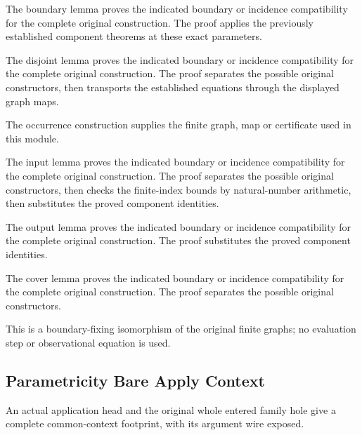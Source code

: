 The boundary lemma proves the indicated boundary or incidence compatibility for the complete original construction.
The proof applies the previously established component theorems at these exact parameters.
\par{}

The disjoint lemma proves the indicated boundary or incidence compatibility for the complete original construction.
The proof separates the possible original constructors, then transports the established equations through the displayed graph maps.
\par{}

The occurrence construction supplies the finite graph, map or certificate used in this module.
\par{}

The input lemma proves the indicated boundary or incidence compatibility for the complete original construction.
The proof separates the possible original constructors, then checks the finite-index bounds by natural-number arithmetic, then substitutes the proved component identities.
\par{}

The output lemma proves the indicated boundary or incidence compatibility for the complete original construction.
The proof substitutes the proved component identities.
\par{}

The cover lemma proves the indicated boundary or incidence compatibility for the complete original construction.
The proof separates the possible original constructors.
\par{}

This is a boundary-fixing isomorphism of the original finite graphs;
no evaluation step or observational equation is used.
\par{}

\subsection{Parametricity Bare Apply Context}
An actual application head and the original whole entered family hole
give a complete common-context footprint, with its argument wire exposed.

